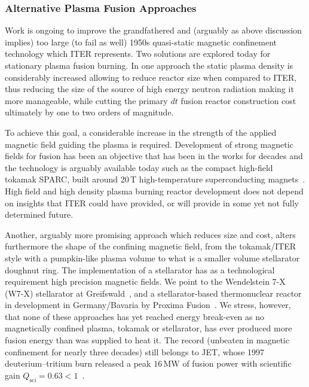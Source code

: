 \documentclass[particles,article,accept,pdftex,moreauthors]{Definitions/mdpi}
\begin{document}
\subsubsection{Alternative Plasma Fusion Approaches}\label{sssec:INTnewPlasma}
Work is ongoing to improve the grandfathered and (arguably as above discussion implies) too large (to fail as well) 1950s quasi-static magnetic confinement technology which ITER represents. Two solutions are explored today for stationary plasma fusion burning. In one approach the static plasma density is considerably increased allowing to reduce reactor size when compared to ITER, thus reducing the size of the source of high energy neutron radiation making it more manageable, while cutting the primary $dt$ fusion reactor construction cost ultimately by one to two orders of magnitude.

To achieve this goal, a considerable increase in the strength of the applied magnetic field guiding the plasma is required. Development of strong magnetic fields for fusion has been an objective that has been in the works for decades and the technology is arguably available today such as the compact high-field tokamak SPARC, built around 20\,T high-temperature superconducting magnets~\cite{Creely:2020}. High field and high density plasma burning reactor development does not depend on insights that ITER could have provided, or will provide in some yet not fully determined future.

Another, arguably more promising approach which reduces size and cost, alters furthermore the shape of the confining magnetic field, from the tokamak/ITER style with a pumpkin-like plasma volume to what is a smaller volume stellarator doughnut ring. The implementation of a stellarator has as a technological requirement high precision magnetic fields. We point to the Wendelstein 7-X (\mbox{W7-X}) stellarator at Greifswald~\cite{Grulke:2024}, and a stellarator-based thermonuclear reactor in development in Germany/Bavaria by Proxima Fusion~\cite{Lion:2025}. We stress, however, that none of these approaches has yet reached energy break-even as no magnetically confined plasma, tokamak or stellarator, has ever produced more fusion energy than was supplied to heat it. The record (unbeaten in magnetic confinement for nearly three decades) still belongs to JET, whose 1997 deuterium--tritium burn released a peak $16\,\mathrm{MW}$ of fusion power with scientific gain $Q_\mathrm{sci}=0.63<1$~\cite{Keilhacker:1999,Wurzel:2025}.

 
\end{document}
